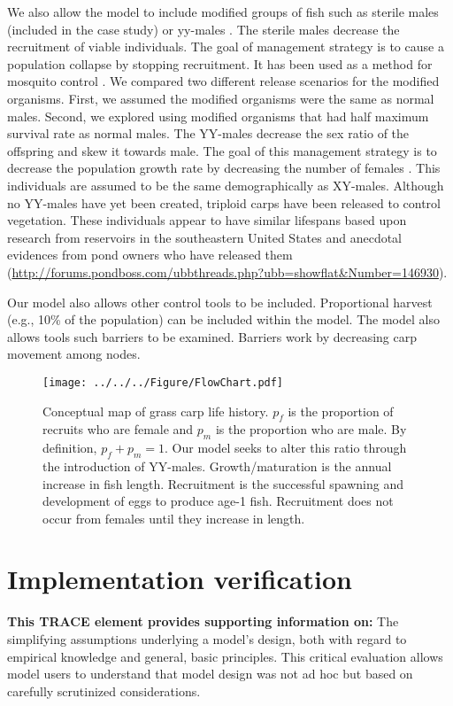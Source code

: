 \documentclass{article}[12pt]
\begin{document}
We also allow the model to include modified groups of fish such as sterile males (included in the case study) or yy-males \citep[previously described in][]{Erickson:2017ecomod}.
The sterile males decrease the recruitment of viable individuals.
The goal of management strategy is to cause a population collapse by stopping recruitment. 
It has been used as a method for mosquito control \citep[e.g.,][]{benedict2003first}.
We compared two different release scenarios for the modified organisms.
First, we assumed the modified organisms were the same as normal males.
Second, we explored using modified organisms that had half maximum survival rate as normal males.
The YY-males decrease the sex ratio of the offspring and skew it towards male.
The goal of this management strategy is to decrease the population growth rate by decreasing the number of females \citep{schill2016production}. 
This individuals are assumed to be the same demographically as XY-males.
Although no YY-males have yet been created, triploid carps have been released to control vegetation.
These individuals appear to have similar lifespans based upon research from reservoirs in the southeastern United States \citep{kirk2003longevity} and anecdotal evidences from pond owners who have released them (\url{http://forums.pondboss.com/ubbthreads.php?ubb=showflat&Number=146930}).

Our model also allows other control tools to be included.
Proportional harvest (e.g., 10\% of the population) can be included within the model.
The model also allows tools such barriers to be examined.
Barriers work by decreasing carp movement among nodes.


\begin{figure}[htbp]
	\centering
	\texttt{[image: ../../../Figure/FlowChart.pdf]} 
	   \caption{Conceptual map of grass carp life history. \(p_f\) is the proportion of recruits who are female and \(p_m\) is the proportion who are male. By definition, \(p_f + p_m = 1\).  Our model seeks to alter this ratio through the introduction of YY-males. Growth/maturation is the annual increase in fish length. Recruitment is the successful spawning and development of eggs to produce age-1 fish. Recruitment does not occur from females until they increase in length.}
   \label{fig:cMap}
\end{figure}


\section{Implementation verification}\label{sec:IpVer}
\textbf{This TRACE element provides supporting information on:} The simplifying assumptions underlying a model's design, both with regard to empirical knowledge and general, basic principles. This critical evaluation allows model users to understand that model design was not ad hoc but based on carefully scrutinized considerations. 
\end{document}
